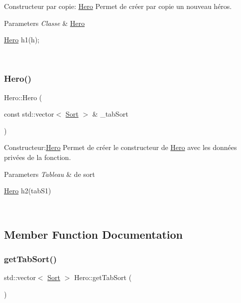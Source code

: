 Constructeur par copie\+: \hyperlink{classHero}{Hero} Permet de créer par copie un nouveau héros. 


\begin{DoxyParams}{Parameters}
{\em Classe} & \hyperlink{classHero}{Hero} 
\begin{DoxyCode}
\hyperlink{classHero}{Hero} h1(h);
\end{DoxyCode}
 \\
\hline
\end{DoxyParams}
\mbox{\label{classHero_a2fab78b80b87c8aa7a45b1ba38272795}} 
\subsubsection{\texorpdfstring{Hero()}{Hero()}\hspace{0.1cm}{\footnotesize\ttfamily [3/3]}}
{\footnotesize\ttfamily Hero\+::\+Hero (\begin{DoxyParamCaption}\item[{const std\+::vector$<$ \hyperlink{classSort}{Sort} $>$ \&}]{\+\_\+tab\+Sort }\end{DoxyParamCaption})}



Constructeur\+:\hyperlink{classHero}{Hero} Permet de créer le constructeur de \hyperlink{classHero}{Hero} avec les données privées de la fonction. 


\begin{DoxyParams}{Parameters}
{\em Tableau} & de sort 
\begin{DoxyCode}
\hyperlink{classHero}{Hero} h2(tabS1)
\end{DoxyCode}
 \\
\hline
\end{DoxyParams}


\subsection{Member Function Documentation}
\mbox{\label{classHero_ab596535fb4e3aeb836bd23780220455b}} 
\subsubsection{\texorpdfstring{get\+Tab\+Sort()}{getTabSort()}}
{\footnotesize\ttfamily std\+::vector$<$ \hyperlink{classSort}{Sort} $>$ Hero\+::get\+Tab\+Sort (\begin{DoxyParamCaption}{ }\end{DoxyParamCaption})}



